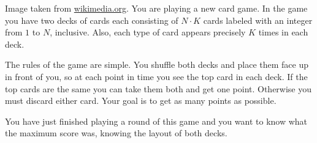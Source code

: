 
    {Image taken from \href{https://commons.wikimedia.org/wiki/File:7_playing_cards.jpg}{wikimedia.org}.}
You are playing a new card game.
In the game you have two decks of cards each consisting of $N \cdot K$ cards labeled with an integer from $1$ to $N$, inclusive.
Also, each type of card appears precisely $K$ times in each deck.

The rules of the game are simple.
You shuffle both decks and place them face up in front of you, so at each point in time you see the top card in each deck.
If the top cards are the same you can take them both and get one point.
Otherwise you must discard either card.
Your goal is to get as many points as possible.

You have just finished playing a round of this game and you want to know what the maximum score was,
    knowing the layout of both decks.

